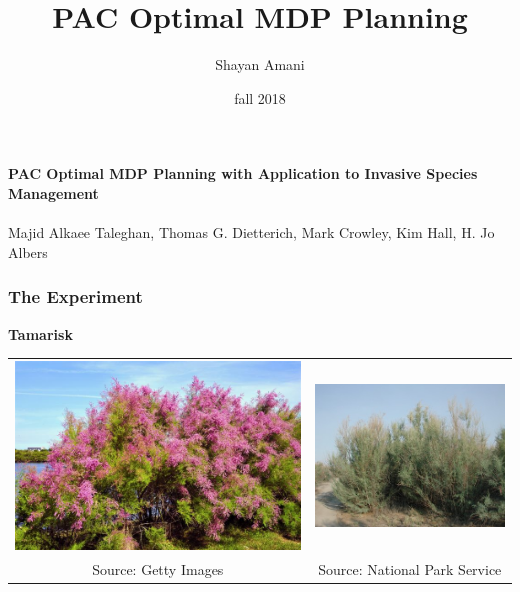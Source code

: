 \documentclass[11pt]{beamer}
\title{PAC Optimal MDP Planning}
\author{Shayan Amani}
\date{fall 2018}
\institute{Department of Computer Science, University of New Hampshire}
\begin{document}
\begin{frame}
    \titlepage
\end{frame}

\begin{frame}
\begin{center}
    \textbf{PAC Optimal MDP Planning with Application to Invasive Species Management}
\\\\
Majid Alkaee Taleghan, Thomas G. Dietterich, Mark Crowley, Kim Hall, H. Jo Albers
\end{center}
\end{frame}

\begin{frame}
\frametitle{The Experiment}
\textbf{Tamarisk}
\begin{tabular}{c c}
    \includegraphics[scale=0.2]{tamarisk.jpg} &   \includegraphics[scale=0.4]{tamarisk1.jpg} \\
    Source: Getty Images & Source: National Park Service
\end{tabular}
\end{frame}
\end{document}
